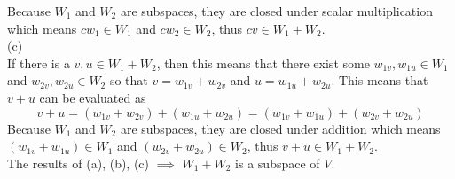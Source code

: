 \documentclass{report}
\begin{document}
Because $W_1$ and $W_2$ are subspaces, they are closed under scalar multiplication which means $cw_1 \in W_1$ and $cw_2 \in W_2$, thus $cv\in W_1 + W_2$.\\
(c) \\
If there is a $v,u\in W_1 + W_2$, then this means that there exist some $w_{1v},w_{1u}\in W_1$ and $w_{2v},w_{2u} \in W_2$ so that $v = w_{1v} + w_{2v}$ and 
$u = w_{1u} + w_{2u}$. 
This means that $v +u$ can be evaluated as $$v+u=(w_{1v} + w_{2v}) + (w_{1u} + w_{2u}) = (w_{1v} + w_{1u}) + (w_{2v} + w_{2u})$$
Because $W_1$ and $W_2$ are subspaces, they are closed under addition which means $(w_{1v} + w_{1u}) \in W_1$ and  $(w_{2v} + w_{2u}) \in W_2$, thus $v + u \in W_1 + W_2$. \\
The results of (a), (b), (c) $\implies$ $W_1+W_2$ is a subspace of $V$.
\end{document}
